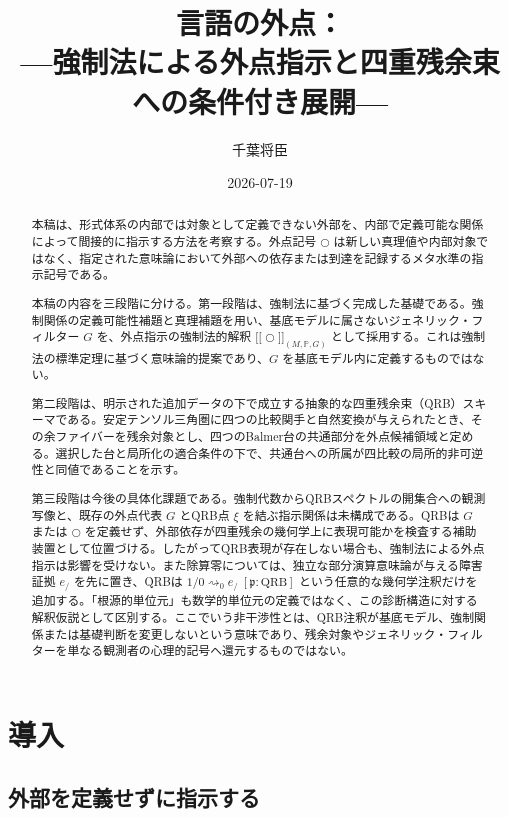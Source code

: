 \documentclass[a4paper,11pt]{ltjsarticle}
\title{言語の外点：\\[0.2em]
  {\Large ---強制法による外点指示と四重残余束への条件付き展開---}}
\author{千葉将臣}
\date{2026-07-19}
\theoremstyle{definition}
\theoremstyle{plain}
\newcommand{\QRB}{\mathrm{QRB}}
\newcommand{\dfix}{\bigcirc}
\newcommand{\sem}[1]{\mathopen{[\![}#1\mathclose{]\!]}}
\begin{document}
\maketitle

\begin{abstract}
本稿は、形式体系の内部では対象として定義できない外部を、内部で定義可能な関係によって間接的に指示する方法を考察する。外点記号 $\dfix$ は新しい真理値や内部対象ではなく、指定された意味論において外部への依存または到達を記録するメタ水準の指示記号である。

本稿の内容を三段階に分ける。第一段階は、強制法に基づく完成した基礎である。強制関係の定義可能性補題と真理補題を用い、基底モデルに属さないジェネリック・フィルター $G$ を、外点指示の強制法的解釈 $\sem{\dfix}_{(M,\mathbb P,G)}$ として採用する。これは強制法の標準定理に基づく意味論的提案であり、$G$ を基底モデル内に定義するものではない。

第二段階は、明示された追加データの下で成立する抽象的な四重残余束（QRB）スキーマである。安定テンソル三角圏に四つの比較関手と自然変換が与えられたとき、その余ファイバーを残余対象とし、四つのBalmer台の共通部分を外点候補領域と定める。選択した台と局所化の適合条件の下で、共通台への所属が四比較の局所的非可逆性と同値であることを示す。

第三段階は今後の具体化課題である。強制代数からQRBスペクトルの開集合への観測写像と、既存の外点代表 $G$ とQRB点 $\xi$ を結ぶ指示関係は未構成である。QRBは $G$ または $\dfix$ を定義せず、外部依存が四重残余の幾何学上に表現可能かを検査する補助装置として位置づける。したがってQRB表現が存在しない場合も、強制法による外点指示は影響を受けない。また除算零については、独立な部分演算意味論が与える障害証拠 $e_{/}$ を先に置き、QRBは $1/0\rightsquigarrow_0e_{/}\;[\mathfrak p:\QRB]$ という任意的な幾何学注釈だけを追加する。「根源的単位元」も数学的単位元の定義ではなく、この診断構造に対する解釈仮説として区別する。ここでいう非干渉性とは、QRB注釈が基底モデル、強制関係または基礎判断を変更しないという意味であり、残余対象やジェネリック・フィルターを単なる観測者の心理的記号へ還元するものではない。
\end{abstract}

\tableofcontents

\section{導入}

\subsection{外部を定義せずに指示する}
\end{document}
